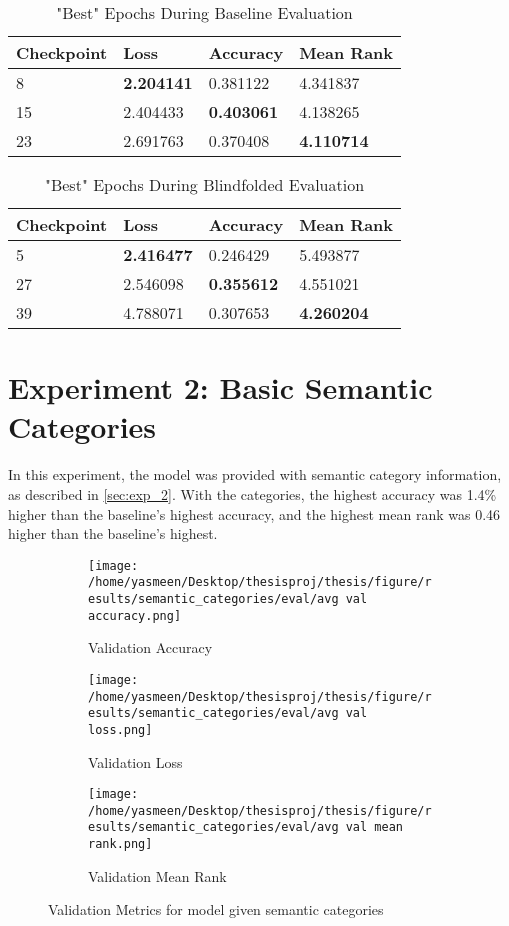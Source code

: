 \begin{table}[ht!]
\centering
\caption{"Best" Epochs During Baseline Evaluation}
\begin{tabular}{l | l | l | l}
Checkpoint & Loss & Accuracy & Mean Rank \\
\hline
8 & \textbf{2.204141} & 0.381122 & 4.341837 \\
15 & 2.404433 & \textbf{0.403061} & 4.138265 \\
23 & 2.691763 & 0.370408 & \textbf{4.110714}
\end{tabular}
\label{tab:best_baseline}
\end{table}

\begin{table}[ht!]
\centering
\caption{"Best" Epochs During Blindfolded Evaluation}
\begin{tabular}{l | l | l | l}
Checkpoint & Loss & Accuracy & Mean Rank \\
\hline
5 & \textbf{2.416477} & 0.246429 & 5.493877 \\
27 & 2.546098 & \textbf{0.355612} & 4.551021 \\
39 & 4.788071 & 0.307653 & \textbf{4.260204}
\end{tabular}
\label{tab:best_blindfolded}
\end{table}


\section{Experiment 2: Basic Semantic Categories}
In this experiment, the model was provided with semantic category information, as described in \ref{sec:exp_2}.
With the categories, the highest accuracy was 1.4\% higher than the baseline's highest accuracy, and the highest mean rank was 0.46 higher than the baseline's highest.

\begin{figure}[ht!]
     \centering
     \begin{subfigure}[b]{0.3\textwidth}
         \centering
         \texttt{[image: /home/yasmeen/Desktop/thesisproj/thesis/figure/results/semantic\_categories/eval/avg val accuracy.png]}
         \caption{Validation Accuracy}
         \label{fig:category_accuracy}
     \end{subfigure}
     \hfill
     \begin{subfigure}[b]{0.3\textwidth}
         \centering
         \texttt{[image: /home/yasmeen/Desktop/thesisproj/thesis/figure/results/semantic\_categories/eval/avg val loss.png]}
         \caption{Validation Loss}
         \label{fig:category_loss}
     \end{subfigure}
     \hfill
     \begin{subfigure}[b]{0.3\textwidth}
         \centering
         \texttt{[image: /home/yasmeen/Desktop/thesisproj/thesis/figure/results/semantic\_categories/eval/avg val mean rank.png]}
         \caption{Validation Mean Rank}
         \label{fig:category_mean_rank}
     \end{subfigure}
     \caption{Validation Metrics for model given semantic categories}
     \label{fig:category_metrics}
\end{figure}

